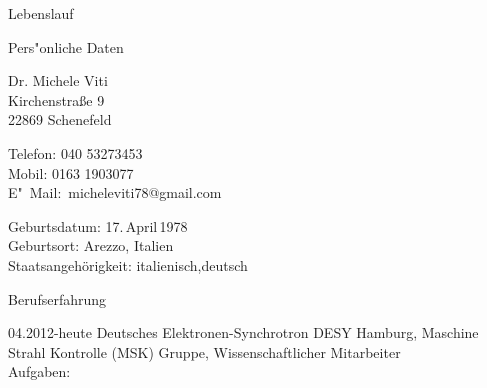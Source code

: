 \documentclass[11pt,a4paper]{scrartcl}
\begin{document}
\begin{cv}{Lebenslauf}
\begin{cvlist}{Pers"onliche Daten}
\item Dr. Michele Viti\\
Kirchenstra{\ss}e 9\\
22869 Schenefeld
\item Telefon: 040 53273453\\
Mobil: 0163 1903077\\
E"~Mail:~micheleviti78@gmail.com
\item Geburtsdatum: 17.\,April\,1978\\
Geburtsort: Arezzo, Italien\\
Staatsangeh\"origkeit: italienisch,deutsch
\end{cvlist}

\begin{cvlist}{Berufserfahrung}

\item[04.2012-heute] Deutsches Elektronen-Synchrotron DESY Hamburg,
Maschine Strahl Kontrolle (MSK) Gruppe, Wissenschaftlicher Mitarbeiter\\

Aufgaben:\\


\end{cvlist}
\end{cv}
\end{document}

